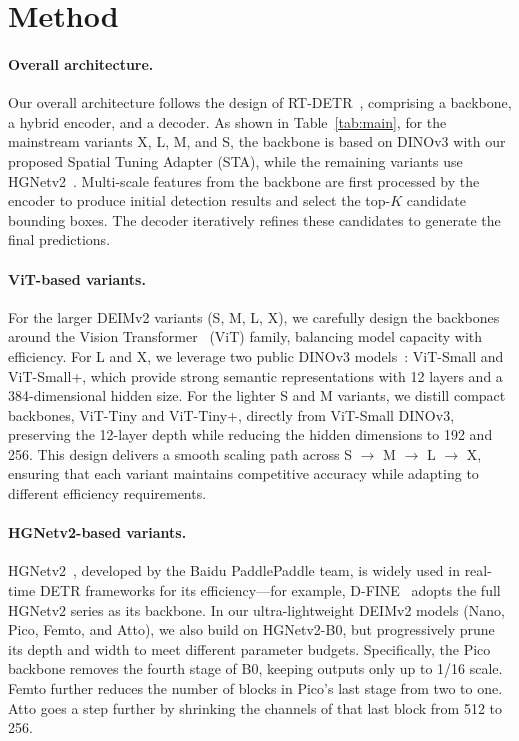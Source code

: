 \section{Method}




\paragraph{Overall architecture.} Our overall architecture follows the design of RT-DETR~\cite{lv2024rt}, comprising a backbone, a hybrid encoder, and a decoder. As shown in Table~\ref{tab:main}, for the mainstream variants X, L, M, and S, the backbone is based on DINOv3 with our proposed Spatial Tuning Adapter (STA), while the remaining variants use HGNetv2~\cite{cui2021beyond}. Multi-scale features from the backbone are first processed by the encoder to produce initial detection results and select the top-$K$ candidate bounding boxes. The decoder iteratively refines these candidates to generate the final predictions.

\paragraph{ViT-based variants.} For the larger DEIMv2 variants (S, M, L, X), we carefully design the backbones around the Vision Transformer~\cite{dosovitskiy2020image} (ViT) family, balancing model capacity with efficiency. For L and X, we leverage two public DINOv3 models~\cite{simeoni2025dinov3}: ViT-Small and ViT-Small+, which provide strong semantic representations with 12 layers and a 384-dimensional hidden size. For the lighter S and M variants, we distill compact backbones, ViT-Tiny and ViT-Tiny+, directly from ViT-Small DINOv3, preserving the 12-layer depth while reducing the hidden dimensions to 192 and 256. This design delivers a smooth scaling path across S $\rightarrow$ M $\rightarrow$ L $\rightarrow$ X, ensuring that each variant maintains competitive accuracy while adapting to different efficiency requirements.

\paragraph{HGNetv2-based variants.} 
HGNetv2~\cite{cui2021beyond}, developed by the Baidu PaddlePaddle team, is widely used in real-time DETR frameworks for its efficiency—for example, D-FINE~\cite{peng2024d} adopts the full HGNetv2 series as its backbone. In our ultra-lightweight DEIMv2 models (Nano, Pico, Femto, and Atto), we also build on HGNetv2-B0, but progressively prune its depth and width to meet different parameter budgets. Specifically, the Pico backbone removes the fourth stage of B0, keeping outputs only up to 1/16 scale. Femto further reduces the number of blocks in Pico’s last stage from two to one. Atto goes a step further by shrinking the channels of that last block from 512 to 256.


